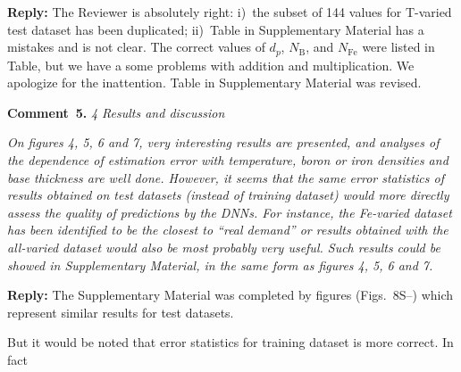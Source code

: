\documentclass[num-refs]{wiley-article} %
\begin{document}
\vspace{0.5cm}
\noindent
\textcolor[rgb]{0.51,0.00,0.00}{\textbf{Reply:}}
The Reviewer is absolutely right:
i)~the subset of 144 values for T-varied test dataset has been duplicated;
ii)~Table in Supplementary Material has a mistakes and is not clear.
The correct values of $d_p$, $N_\mathrm{B}$, and $N_{\mathrm{Fe}}$ were listed in Table,
but we have a some problems with addition and multiplication.
We apologize for the inattention.
Table in Supplementary Material was revised.

\vspace{1cm}
\noindent
\textcolor[rgb]{0.00,0.50,1.00}{\textbf{Comment~5.}}
\emph{4 Results and discussion}

\emph{
On figures 4, 5, 6 and 7, very interesting results are presented, 
and analyses of the dependence of estimation
error with temperature, boron or iron densities and base thickness are well done.
However, it seems that the same error statistics of results obtained on test datasets
(instead of training dataset) would more directly assess the quality of predictions by the DNNs.
For instance, the Fe-varied dataset has been identified to be
the closest to “real demand” or results obtained with the all-varied dataset 
would also be most probably very useful.
Such results could be showed in Supplementary Material, in the same form as figures 4, 5, 6 and 7. }

\vspace{0.5cm}
\noindent
\textcolor[rgb]{0.51,0.00,0.00}{\textbf{Reply:}}
The Supplementary Material was completed by figures (Figs.~8S--) 
which  represent similar results for test datasets.

But it would be noted that error statistics for training dataset is more correct.
In fact






%


\end{document}

